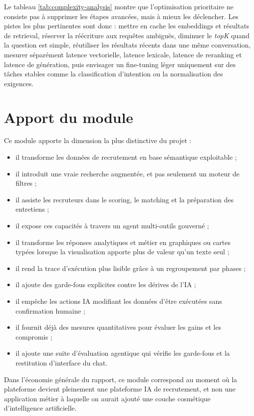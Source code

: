 Le tableau \ref{tab:complexity-analysis} montre que l'optimisation prioritaire ne consiste pas à supprimer les étapes avancées, mais à mieux les déclencher. Les pistes les plus pertinentes sont donc : mettre en cache les embeddings et résultats de retrieval, réserver la réécriture aux requêtes ambiguës, diminuer le \textit{topK} quand la question est simple, réutiliser les résultats récents dans une même conversation, mesurer séparément latence vectorielle, latence lexicale, latence de reranking et latence de génération, puis envisager un fine-tuning léger uniquement sur des tâches stables comme la classification d'intention ou la normalisation des exigences.

\section{Apport du module}
Ce module apporte la dimension la plus distinctive du projet :
\begin{itemize}
  \item il transforme les données de recrutement en base sémantique exploitable ;
  \item il introduit une vraie recherche augmentée, et pas seulement un moteur de filtres ;
  \item il assiste les recruteurs dans le scoring, le matching et la préparation des entretiens ;
  \item il expose ces capacités à travers un agent multi-outils gouverné ;
  \item il transforme les réponses analytiques et métier en graphiques ou cartes typées lorsque la visualisation apporte plus de valeur qu'un texte seul ;
  \item il rend la trace d'exécution plus lisible grâce à un regroupement par phases ;
  \item il ajoute des garde-fous explicites contre les dérives de l'IA ;
  \item il empêche les actions IA modifiant les données d'être exécutées sans confirmation humaine ;
  \item il fournit déjà des mesures quantitatives pour évaluer les gains et les compromis ;
  \item il ajoute une suite d'évaluation agentique qui vérifie les garde-fous et la restitution d'interface du chat.
\end{itemize}

Dans l'économie générale du rapport, ce module correspond au moment où la plateforme devient pleinement une plateforme IA de recrutement, et non une application métier à laquelle on aurait ajouté une couche cosmétique d'intelligence artificielle.

